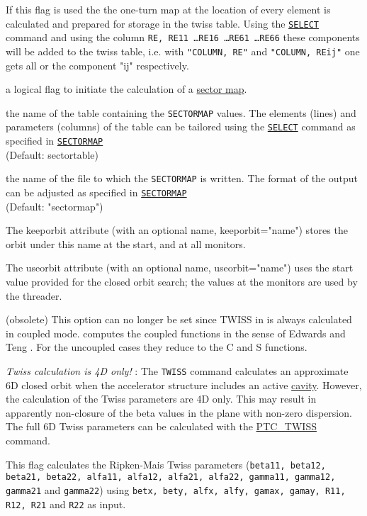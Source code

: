 \begin{madlist}
   If this flag is used the the one-turn map at the
  location of every element is calculated and prepared for
  storage in the twiss table. Using the
  \hyperref[sec:select]{\tt SELECT} command and using
  the column {\tt RE, RE11 \ldots RE16 \ldots RE61 \ldots RE66} these
  components will be added to the twiss table, i.e. with {\tt "COLUMN, RE"} and
  {\tt "COLUMN, REij"} one gets all or the component "ij" respectively.    

   a logical flag to initiate the calculation of a 
  \hyperref[subsec:sectormap]{sector map}.
  
   the name of the table containing the {\tt SECTORMAP}
  values. The elements (lines) and parameters (columns) 
  of the table can be tailored using the \hyperref[sec:select]{\tt SELECT} 
  command as specified in \hyperref[subsec:sectormap]{\tt SECTORMAP} \\
  (Default: sectortable)

   the name of the file to which the {\tt SECTORMAP} is
  written. 
  The format of the output can be adjusted as specified in 
  \hyperref[subsec:sectormap]{\tt SECTORMAP} \\
  (Default: "sectormap")
  
   The keeporbit attribute (with an optional name,
  keeporbit="name") stores the orbit under this name at the
  start, and at all monitors.    

   The useorbit attribute (with an optional name,
  useorbit="name") uses the start value provided for the closed
  orbit search; the values at the monitors are used by the
  threader.    

   (obsolete) This \madeight option can no
  longer be set since TWISS in \madx is always calculated in
  coupled mode. \madx computes the coupled functions in the
  sense of Edwards and Teng \cite{edwards1973}. 
  For the uncoupled cases they reduce to the C and S functions.    
  
  \textit{ Twiss calculation is 4D only!} : The {\tt TWISS}
  command calculates an approximate 6D closed orbit when the
  accelerator structure includes an active
  \hyperref[sec:rfcavity]{cavity}. However, the
  calculation of the Twiss parameters are 4D only. This may
  result in apparently non-closure of the beta values in the
  plane with non-zero dispersion. The full 6D Twiss parameters
  can be calculated with the
  \hyperref[chap:ptc_twiss]{PTC\_TWISS} command.    

   This flag calculates the Ripken-Mais Twiss
  parameters ({\tt beta11, beta12, beta21, beta22, alfa11, alfa12,
  alfa21, alfa22, gamma11, gamma12, gamma21} and {\tt gamma22}) using
  {\tt betx, bety, alfx, alfy, gamax, gamay, R11, R12, R21} and {\tt R22} as
  input.  

\end{madlist}

